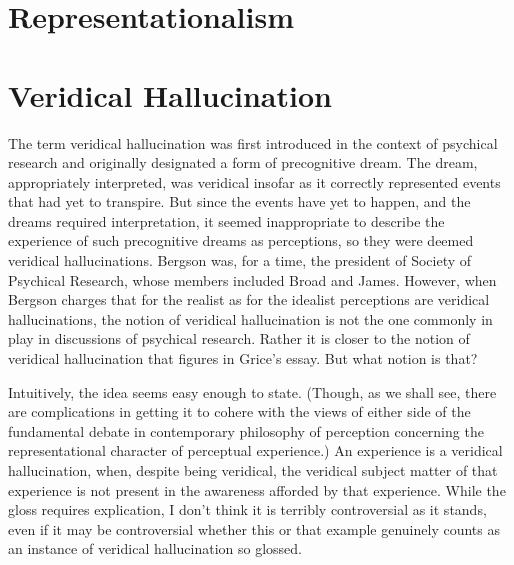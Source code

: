 \documentclass[12pt]{article}
\begin{document}

\section{Representationalism} %
\label{sec:representationalism}


\section{Veridical Hallucination} %
\label{sec:veridical_hallucination}

The term veridical hallucination was first introduced in the context of psychical research and originally designated a form of precognitive dream. The dream, appropriately interpreted, was veridical insofar as it correctly represented events that had yet to transpire. But since the events have yet to happen, and the dreams required interpretation, it seemed inappropriate to describe the experience of such precognitive dreams as perceptions, so they were deemed veridical hallucinations. Bergson was, for a time, the president of Society of Psychical Research, whose members included Broad and James. However, when Bergson charges that for the realist as for the idealist perceptions are veridical hallucinations, the notion of veridical hallucination is not the one commonly in play in discussions of psychical research. Rather it is closer to the notion of veridical hallucination that figures in Grice's \citeyearpar{Grice:1962jw} essay. But what notion is that?

Intuitively, the idea seems easy enough to state. (Though, as we shall see, there are complications in getting it to cohere with the views of either side of the fundamental debate in contemporary philosophy of perception concerning the representational character of perceptual experience.) An experience is a veridical hallucination, when, despite being veridical, the veridical subject matter of that experience is not present in the awareness afforded by that experience. While the gloss requires explication, I don't think it is terribly controversial as it stands, even if it may be controversial whether this or that example genuinely counts as an instance of veridical hallucination so glossed.
\end{document}
